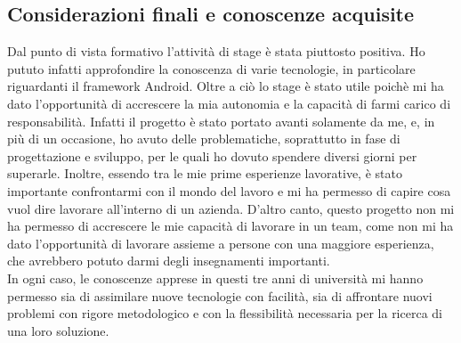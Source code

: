 \documentclass[../Tesi.tex]{subfiles}
\begin{document}
	\subsection{Considerazioni finali e conoscenze acquisite}
	Dal punto di vista formativo l'attività di stage è stata piuttosto positiva. Ho pututo infatti approfondire la conoscenza di varie tecnologie, in particolare riguardanti il framework Android. Oltre a ciò lo stage è stato utile poichè mi ha dato l'opportunità di accrescere la mia autonomia e la capacità di farmi carico di responsabilità. Infatti il progetto è stato portato avanti solamente da me, e, in più di un occasione, ho avuto delle problematiche, soprattutto in fase di progettazione e sviluppo, per le quali ho dovuto spendere diversi giorni per superarle. Inoltre, essendo tra le mie prime esperienze lavorative, è stato importante confrontarmi con il mondo del lavoro e mi ha permesso di capire cosa vuol dire lavorare all'interno di un azienda. D'altro canto, questo progetto non mi ha permesso di accrescere le mie capacità di lavorare in un team, come non mi ha dato l'opportunità di lavorare assieme a persone con una maggiore esperienza, che avrebbero potuto darmi degli insegnamenti importanti.\\
	In ogni caso, le conoscenze apprese in questi tre anni di università mi hanno permesso sia di assimilare nuove tecnologie con facilità, sia di affrontare nuovi problemi con rigore metodologico e con la flessibilità necessaria per la ricerca di una loro soluzione. 
\end{document}
